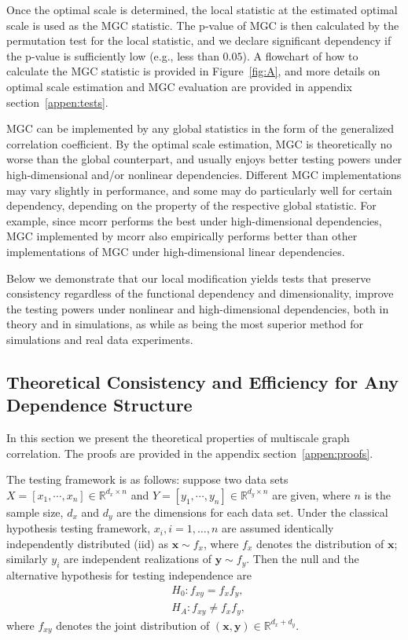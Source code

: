 \documentclass[11pt]{article}
\providecommand{\mb}[1]{\boldsymbol{#1}}
\newcommand{\Real}{\mathbb{R}}
\begin{document}
Once the optimal scale is determined, the local statistic at the estimated optimal scale is used as the MGC statistic. The p-value of MGC is then calculated by the permutation test for the local statistic, and we declare significant dependency if the p-value is sufficiently low (e.g., less than $0.05$). A flowchart of how to calculate the MGC statistic is provided in Figure~\ref{fig:A}, and more details on optimal scale estimation and MGC evaluation are provided in appendix section~\ref{appen:tests}.

MGC can be implemented by any global statistics in the form of the generalized correlation coefficient. By the optimal scale estimation, MGC is theoretically no worse than the global counterpart, and usually enjoys better testing powers under high-dimensional and/or nonlinear dependencies. Different MGC implementations may vary slightly in performance, and some may do particularly well for certain dependency, depending on the property of the respective global statistic. For example, since mcorr performs the best under high-dimensional dependencies, MGC implemented by mcorr also empirically performs better than other implementations of MGC under high-dimensional linear dependencies. 

Below we demonstrate that our local modification yields tests that preserve consistency regardless of the functional dependency and dimensionality, improve the testing powers under nonlinear and high-dimensional dependencies, both in theory and in simulations, as while as being the most superior method for simulations and real data experiments.


\subsection{Theoretical Consistency and Efficiency for Any Dependence Structure}
\label{main2}
In this section we present the theoretical properties of multiscale graph correlation. The proofs are provided in the appendix section~\ref{appen:proofs}. 

The testing framework is as follows: suppose two data sets $X=[x_{1},\cdots, x_{n}] \in \Real^{d_{x} \times n}$ and $Y=[y_{1},\cdots, y_{n}] \in \Real^{d_{y} \times n}$ are given, where $n$ is the sample size, $d_{x}$ and $d_{y}$ are the dimensions for each data set. Under the classical hypothesis testing framework, $x_{i}, i=1,\ldots,n$ are assumed identically independently distributed (iid) as $\mb{x} \sim f_{x}$, where $f_{x}$ denotes the distribution of $\mb{x}$; similarly $y_{i}$ are independent realizations of $\mb{y} \sim f_{y}$. Then the null and the alternative hypothesis for testing independence are
\begin{align*}
& H_{0}: f_{xy}=f_{x}f_{y},\\
& H_{A}: f_{xy} \neq f_{x}f_{y},
\end{align*}
where $f_{xy}$ denotes the joint distribution of $(\mb{x},\mb{y}) \in \Real^{d_{x} + d_{y}}$. 
\end{document}
